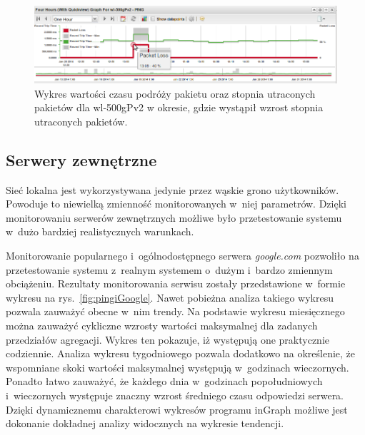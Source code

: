 \begin{figure}[ht]
  \caption{Wykres wartości czasu podróży pakietu oraz stopnia
    utraconych pakietów dla wl-500gPv2 w okresie, gdzie wystąpił
    wzrost stopnia utraconych pakietów.}
  \label{fig:pingRouteraDokladny}
  \centering
\includegraphics[width=1\textwidth]{img/pingiRouterDokladny.png}
\end{figure}

\subsection[Serwery zewnętrzne][Serwery zewnętrzne]{Serwery zewnętrzne}

Sieć lokalna jest wykorzystywana jedynie przez wąskie grono
użytkowników. Powoduje to niewielką zmienność monitorowanych w~niej
parametrów. Dzięki monitorowaniu serwerów zewnętrznych możliwe było
przetestowanie systemu w~dużo bardziej realistycznych warunkach.

Monitorowanie popularnego i~ogólnodostępnego serwera {\em google.com}
pozwoliło na przetestowanie systemu z~realnym systemem o~dużym
i~bardzo zmiennym obciążeniu. Rezultaty monitorowania serwisu zostały
przedstawione w~formie wykresu na rys.~\ref{fig:pingiGoogle}. Nawet
pobieżna analiza takiego wykresu pozwala zauważyć obecne w~nim
trendy. Na podstawie wykresu miesięcznego można zauważyć cykliczne
wzrosty wartości maksymalnej dla zadanych przedziałów
agregacji. Wykres ten pokazuje, iż występują one praktycznie
codziennie. Analiza wykresu tygodniowego pozwala dodatkowo na
określenie, że wspomniane skoki wartości maksymalnej występują
w~godzinach wieczornych. Ponadto łatwo zauważyć, że każdego dnia
w~godzinach popołudniowych i~wieczornych występuje znaczny wzrost
średniego czasu odpowiedzi serwera. Dzięki dynamicznemu charakterowi
wykresów programu inGraph możliwe jest dokonanie dokładnej analizy
widocznych na wykresie tendencji.


